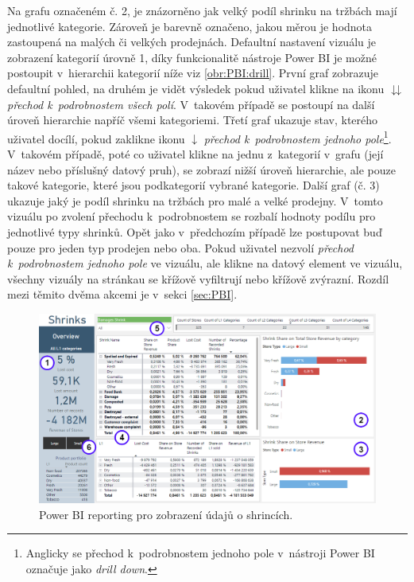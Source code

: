Na grafu označeném č. 2, je znázorněno jak velký podíl shrinku na tržbách mají jednotlivé kategorie. Zároveň je barevně označeno, jakou měrou je hodnota zastoupená na malých či velkých prodejnách. Defaultní nastavení vizuálu je zobrazení kategorií úrovně 1, díky funkcionalitě nástroje Power BI je možné postoupit v~hierarchii kategorií níže viz \ref*{obr:PBI:drill}. První graf zobrazuje defaultní pohled, na druhém je vidět výsledek pokud uživatel klikne na ikonu $\downdownarrows$ \emph{přechod k~podrobnostem všech polí}. V~takovém případě se postoupí na další úroveň hierarchie napříč všemi kategoriemi. Třetí graf ukazuje stav, kterého uživatel docílí, pokud zaklikne ikonu $\downarrow$ \emph{přechod k~podrobnostem jednoho pole}\footnote{Anglicky se přechod k~podrobnostem jednoho pole v~nástroji Power BI označuje jako \emph{drill down}.}. V~takovém případě, poté co uživatel klikne na jednu z~kategorií v~grafu (její název nebo příslušný datový pruh), se zobrazí nižší úroveň hierarchie, ale pouze takové kategorie, které jsou podkategorií vybrané kategorie. 
Další graf (č. 3) ukazuje jaký je podíl shrinku na tržbách pro malé a velké prodejny. V~tomto vizuálu po zvolení přechodu k~podrobnostem se rozbalí hodnoty podílu pro jednotlivé typy shrinků. Opět jako v~předchozím případě lze postupovat buď pouze pro jeden typ prodejen nebo oba.
Pokud uživatel nezvolí \emph{přechod k~podrobnostem jednoho pole} ve vizuálu, ale klikne na datový element ve vizuálu, všechny vizuály na stránkau se křížově vyfiltrují nebo křížově zvýrazní. Rozdíl mezi těmito dvěma akcemi je v~sekci \ref*{sec:PBI}. 
\begin{figure}[h!]
    \centering
    \captionsetup{justification=centering}
    \includegraphics[width=\textwidth]{obrazky/PBI/overview.png}
    \caption{Power BI reporting pro zobrazení údajů o shrincích.}
    \label{obr:PBI:overview}
\end{figure}

